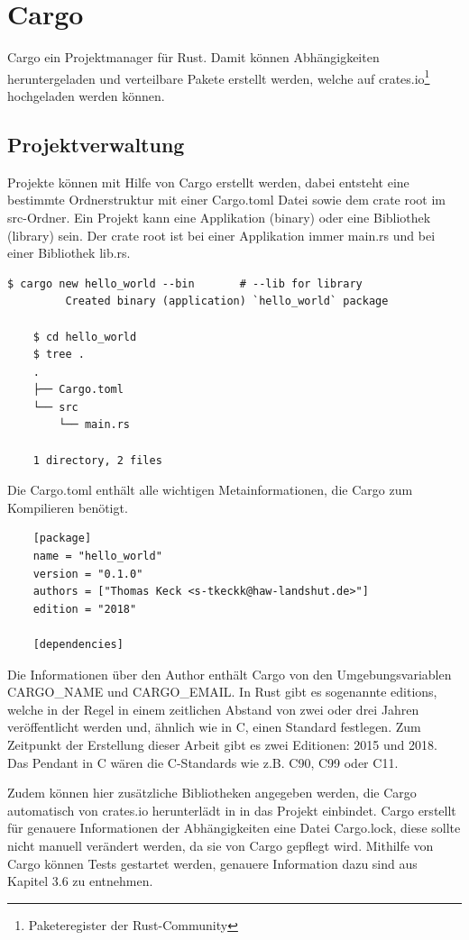 \section{Cargo}

Cargo ein Projektmanager für Rust. Damit können Abhängigkeiten heruntergeladen und verteilbare Pakete erstellt werden, welche auf crates.io\footnote{Paketeregister der Rust-Community} hochgeladen werden können. \cite{CargoBook}

\subsection{Projektverwaltung}

Projekte können mit Hilfe von Cargo erstellt werden, dabei entsteht eine bestimmte Ordnerstruktur mit einer Cargo.toml Datei sowie dem crate root im src-Ordner. Ein Projekt kann eine Applikation (binary) oder eine Bibliothek (library) sein. Der crate root ist bei einer Applikation immer \glqq main.rs\grqq{} und bei einer Bibliothek \glqq lib.rs\grqq{}.

\begin{lstlisting}[style=tree]
    $ cargo new hello_world --bin       # --lib for library
         Created binary (application) `hello_world` package

    $ cd hello_world
    $ tree .
    .
    ├── Cargo.toml
    └── src
        └── main.rs
    
    1 directory, 2 files
\end{lstlisting}

Die Cargo.toml enthält alle wichtigen Metainformationen, die Cargo zum Kompilieren benötigt. 

\begin{lstlisting}
    [package]
    name = "hello_world"
    version = "0.1.0"
    authors = ["Thomas Keck <s-tkeckk@haw-landshut.de>"]
    edition = "2018"
    
    [dependencies]    
\end{lstlisting}

Die Informationen über den Author enthält Cargo von den Umgebungsvariablen CARGO\_NAME und CARGO\_EMAIL. In Rust gibt es sogenannte editions, welche in der Regel in einem zeitlichen Abstand von zwei oder drei Jahren veröffentlicht werden und, ähnlich wie in C, einen Standard festlegen. Zum Zeitpunkt der Erstellung dieser Arbeit gibt es zwei Editionen: 2015 und 2018. Das Pendant in C wären die C-Standards wie z.B. C90, C99 oder C11.

Zudem können hier zusätzliche Bibliotheken angegeben werden, die Cargo automatisch von crates.io herunterlädt in in das Projekt einbindet. Cargo erstellt für genauere Informationen der Abhängigkeiten eine Datei Cargo.lock, diese sollte nicht manuell verändert werden, da sie von Cargo gepflegt wird. Mithilfe von Cargo können Tests gestartet werden, genauere Information dazu sind aus Kapitel 3.6 zu entnehmen.


